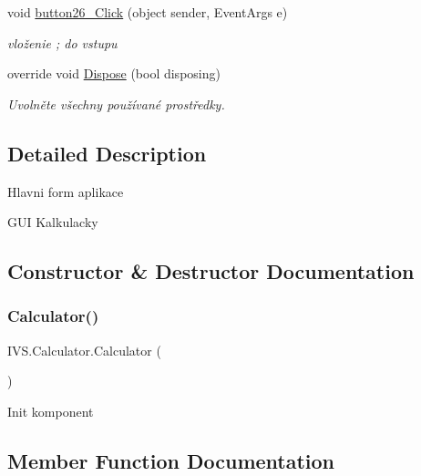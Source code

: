 \begin{DoxyCompactItemize}
void \mbox{\hyperlink{class_i_v_s_1_1_calculator_a50b09cd75e77f655a9e082b8df2ad4c5}{button26\+\_\+\+Click}} (object sender, Event\+Args e)
\begin{DoxyCompactList}\small\item\em vloženie \textquotesingle{};\textquotesingle{} do vstupu \end{DoxyCompactList}\item 
override void \mbox{\hyperlink{class_i_v_s_1_1_calculator_aefacad0176c6b732e4fdd19829c3a37a}{Dispose}} (bool disposing)
\begin{DoxyCompactList}\small\item\em Uvolněte všechny používané prostředky. \end{DoxyCompactList}\end{DoxyCompactItemize}


\subsection{Detailed Description}
Hlavni form aplikace 

G\+UI Kalkulacky 

\subsection{Constructor \& Destructor Documentation}
\mbox{\label{class_i_v_s_1_1_calculator_a3d3f790c8ecb804fe212427b914dd82f}} 
\subsubsection{\texorpdfstring{Calculator()}{Calculator()}}
{\footnotesize\ttfamily I\+V\+S.\+Calculator.\+Calculator (\begin{DoxyParamCaption}{ }\end{DoxyParamCaption})}



Init komponent 



\subsection{Member Function Documentation}
\mbox{\label{class_i_v_s_1_1_calculator_aa06324ed88e9004bf9cd91dd9195e146}} 

